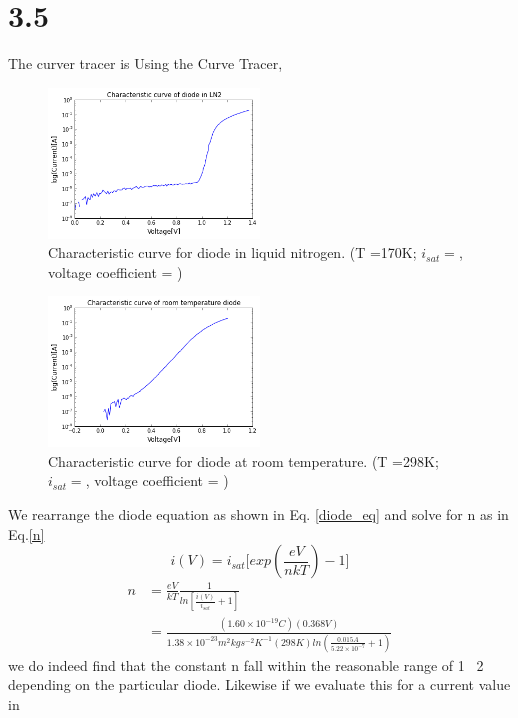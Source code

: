 \documentclass[authoryear, 12pt,5p, times]{elsarticle}
\begin{document}
\section*{3.5}

The curver tracer is  
Using the Curve Tracer, 
\begin{figure}[h!]
\center
\includegraphics[width=0.5\textwidth]{figure/3_5_ln2}
\caption{Characteristic curve for diode in liquid nitrogen. (T =170K; $i_{sat}=$, voltage coefficient = )}
\label{3_5_ln2}
\end{figure}
\begin{figure}[h!]
\center
\includegraphics[width=0.5\textwidth]{figure/3_5_norm}
\caption{Characteristic curve for diode at room temperature. (T =298K; $i_{sat}=$, voltage coefficient = ) }
\label{3_5_norm}
\end{figure}
\par We rearrange the diode equation as shown in Eq. \ref{diode_eq} and solve for n as in Eq.\ref{n}
\begin{equation}
i(V) = i_{sat}\Bigg[exp(\frac{eV}{nkT})-1\Bigg]
\label{diode_eq}
\end{equation}
\begin{equation}
\begin{split}
n &= \frac{eV}{kT}\frac{1}{ln[\frac{i(V)}{i_{sat}}+1]} \\&= \frac{(1.60\times10^{-19}C)(0.368V)}{1.38\times10^{-23}m^2kgs^{-2}K^{-1}(298K)ln(\frac{0.015A}{5.22\times10^{-7}}+1)}
\label{n}
\end{split}
\end{equation}
we do indeed find that the constant n fall within the reasonable range of 1~ 2  depending on the particular diode. Likewise if we evaluate this for a current value in 
\end{document}
